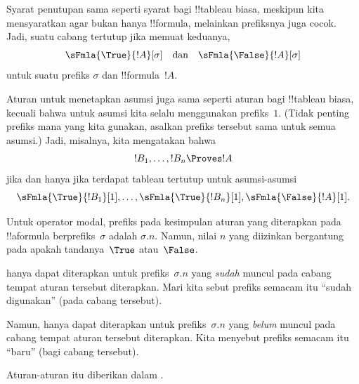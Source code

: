 \documentclass[../../../include/open-logic-section]{subfiles}
\begin{document}
Syarat penutupan sama seperti syarat bagi !!{tableau} biasa, meskipun kita
mensyaratkan agar bukan hanya !!{formula}, melainkan prefiksnya juga cocok.
Jadi, suatu cabang tertutup jika memuat keduanya,
\[
\sFmla{\True}{!A}[\sigma] \quad\text{dan}\quad
\sFmla{\False}{!A}[\sigma]
\]
untuk suatu prefiks $\sigma$ dan !!{formula}~$!A$.

Aturan untuk menetapkan asumsi juga sama seperti aturan bagi !!{tableau}
biasa, kecuali bahwa untuk asumsi kita selalu menggunakan prefiks~$1$.
(Tidak penting prefiks mana yang kita gunakan, asalkan prefiks tersebut sama
untuk semua asumsi.) Jadi, misalnya, kita mengatakan bahwa
\[
!B_1, \dots, !B_n \Proves !A
\]
jika dan hanya jika terdapat tableau tertutup untuk asumsi-asumsi
\[
\sFmla{\True}{!B_1}[1], \dots, \sFmla{\True}{!B_n}[1],
\sFmla{\False}{!A}[1].
\]

Untuk operator modal, prefiks pada
kesimpulan aturan yang diterapkan pada !!a{formula} berprefiks~$\sigma$
adalah $\sigma.n$. Namun, nilai $n$ yang diizinkan bergantung pada apakah
tandanya~$\True$ atau~$\False$.

 hanya dapat
diterapkan untuk prefiks~$\sigma.n$ yang \emph{sudah} muncul pada cabang
tempat aturan tersebut diterapkan. Mari kita sebut prefiks semacam itu
``sudah digunakan'' (pada cabang tersebut).

Namun,  hanya
dapat diterapkan untuk prefiks~$\sigma.n$ yang \emph{belum} muncul pada
cabang tempat aturan tersebut diterapkan. Kita menyebut prefiks semacam itu
``baru'' (bagi cabang tersebut).

Aturan-aturan itu diberikan dalam .
\end{document}
